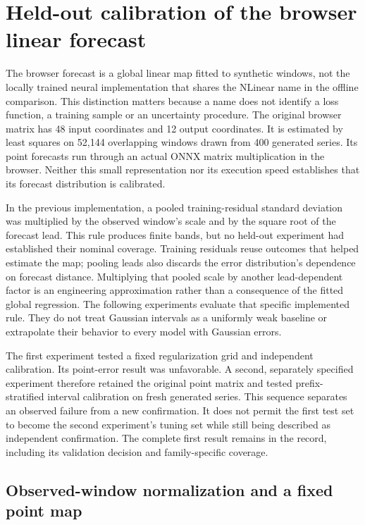 \section{Held-out calibration of the browser linear forecast}
\label{sec:browser-calibration}

The browser forecast is a global linear map fitted to synthetic windows, not
the locally trained neural implementation that shares the NLinear name in the
offline comparison. This distinction matters because a name does not identify
a loss function, a training sample or an uncertainty procedure. The original
browser matrix has 48 input coordinates and 12 output coordinates. It is
estimated by least squares on 52,144 overlapping windows drawn from 400
generated series. Its point forecasts run through an actual ONNX matrix
multiplication in the browser. Neither this small representation nor its
execution speed establishes that its forecast distribution is calibrated.

In the previous implementation, a pooled training-residual standard deviation
was multiplied by the observed window's scale and by the square root of the
forecast lead. This rule produces finite bands, but no held-out experiment had
established their nominal coverage. Training residuals reuse outcomes that
helped estimate the map; pooling leads also discards the error distribution's
dependence on forecast distance. Multiplying that pooled scale by another
lead-dependent factor is an engineering approximation rather than a consequence
of the fitted global regression. The following experiments evaluate that
specific implemented rule. They do not treat Gaussian intervals as a uniformly
weak baseline or extrapolate their behavior to every model with Gaussian errors.

The first experiment tested a fixed regularization grid and independent
calibration. Its point-error result was unfavorable. A second, separately
specified experiment therefore retained the original point matrix and tested
prefix-stratified interval calibration on fresh generated series. This sequence
separates an observed failure from a new confirmation. It does not permit the
first test set to become the second experiment's tuning set while still being
described as independent confirmation. The complete first result remains in
the record, including its validation decision and family-specific coverage.

\subsection{Observed-window normalization and a fixed point map}
\label{sec:browser-normalization}

